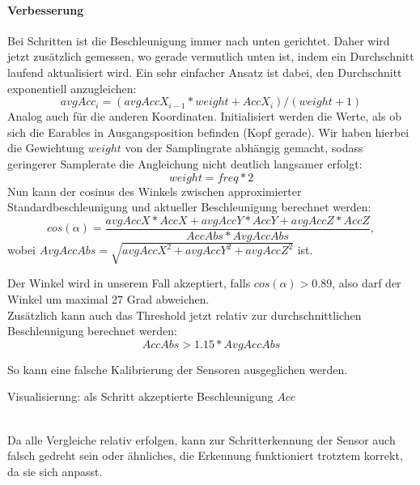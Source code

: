 \documentclass[a4paper,12pt]{article}
\begin{document}
\paragraph{Verbesserung}
Bei Schritten ist die Beschleunigung immer nach unten gerichtet. Daher wird jetzt zusätzlich gemessen, wo gerade vermutlich unten ist, indem ein Durchschnitt laufend aktualisiert wird. Ein sehr einfacher Ansatz ist dabei, den Durchschnitt exponentiell anzugleichen:
\begin{equation}
	avgAcc_i = (avgAccX_{i-1} * weight + AccX_i) /(weight + 1)
\end{equation}
Analog auch für die anderen Koordinaten. Initialisiert werden die Werte, als ob sich die Earables in Ausgangsposition befinden (Kopf gerade). Wir haben hierbei die Gewichtung $weight$ von der Samplingrate abhängig gemacht, sodass geringerer Samplerate die Angleichung nicht deutlich langsamer erfolgt:
\begin{equation}
	weight = freq * 2
\end{equation}
Nun kann der cosinus des Winkels zwischen approximierter Standardbeschleunigung und aktueller Beschleunigung berechnet werden:
\begin{equation}
	cos(\alpha) = \frac{avgAccX * AccX + avgAccY * AccY + avgAccZ * AccZ}{ AccAbs * AvgAccAbs },
\end{equation}
wobei $AvgAccAbs = \sqrt{avgAccX^2+avgAccY^2+avgAccZ^2}$ ist.\\
\newline
\noindent
\begin{minipage}{0.5\textwidth}
	Der Winkel wird in unserem Fall akzeptiert, falls $cos(\alpha) > 0.89$, also darf der Winkel um maximal 27 Grad abweichen.\\
	
	Zusätzlich kann auch das Threshold jetzt relativ zur durchschnittlichen Beschleunigung berechnet werden:
	\begin{equation}
		AccAbs > 1.15 * AvgAccAbs
	\end{equation}
	
	So kann eine falsche Kalibrierung der Sensoren ausgeglichen werden.
\end{minipage}
\hspace{0.1\textwidth}
\begin{minipage}{0.35\textwidth}
	
	Visualisierung: als Schritt akzeptierte Beschleunigung $Acc$
\end{minipage}
\vspace{0.5cm}\\
Da alle Vergleiche relativ erfolgen, kann zur Schritterkennung der Sensor auch falsch gedreht sein oder ähnliches, die Erkennung funktioniert trotztem korrekt, da sie sich anpasst.\\
\end{document}
